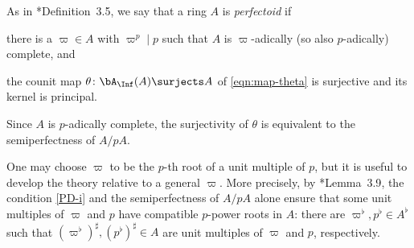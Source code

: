 \epp





  \label{perfectoid-def}
As in \cite{BMS18}*{Definition~3.5}, we say that a ring $A$ is \emph{perfectoid} if
\benumr
\item \label{PD-i}
there is a $\varpi \in A$ with $\varpi^p \mid p$ such that $A$ is $\varpi$-adically (so also $p$-adically) complete, and

\item \label{PD-ii}
the counit map $\theta\colon \bA_\Inf(A) \surjects A$ of \eqref{eqn:map-theta} is surjective and its kernel is principal.



\eenum

Since $A$ is $p$-adically complete, the surjectivity of $\theta$ is equivalent to the semiperfectness of $A/pA$.

One may choose $\varpi$ to be the $p$-th root of a unit multiple of $p$, but it is useful to develop the theory relative to a general $\varpi$. More precisely, by \cite{BMS18}*{Lemma~3.9}, the condition \ref{PD-i} and the semiperfectness of $A/pA$ alone ensure that some unit multiples of $\varpi$ and $p$ have compatible $p$-power roots in $A$: there are $\varpi^\flat, p^\flat \in A^\flat$ such that $(\varpi^\flat)^\sharp, (p^\flat)^\sharp \in A$ are unit multiples of $\varpi$ and $p$, respectively.


